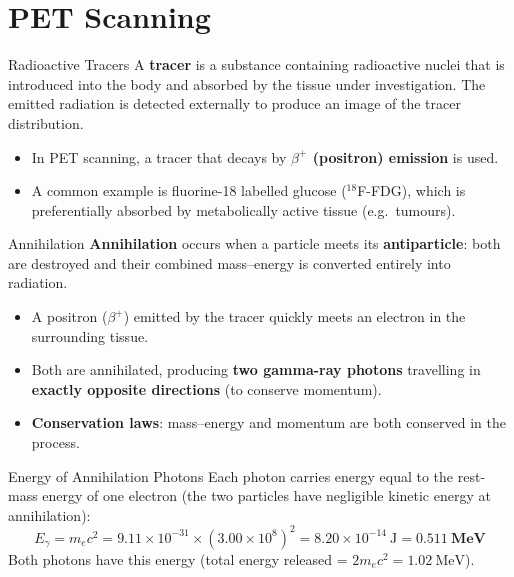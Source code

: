 \section{PET Scanning}

\begin{definitionbox}{Radioactive Tracers}
A \textbf{tracer} is a substance containing radioactive nuclei that is introduced into the body and absorbed by the tissue under investigation. The emitted radiation is detected externally to produce an image of the tracer distribution.
\begin{itemize}[itemsep=2pt]
  \item In PET scanning, a tracer that decays by \textbf{$\beta^+$ (positron) emission} is used.
  \item A common example is fluorine-18 labelled glucose ($^{18}$F-FDG), which is preferentially absorbed by metabolically active tissue (e.g.\ tumours).
\end{itemize}
\end{definitionbox}

\begin{definitionbox}{Annihilation}
\textbf{Annihilation} occurs when a particle meets its \textbf{antiparticle}: both are destroyed and their combined mass--energy is converted entirely into radiation.
\begin{itemize}[itemsep=2pt]
  \item A positron ($\beta^+$) emitted by the tracer quickly meets an electron in the surrounding tissue.
  \item Both are annihilated, producing \textbf{two gamma-ray photons} travelling in \textbf{exactly opposite directions} (to conserve momentum).
  \item \textbf{Conservation laws}: mass--energy and momentum are both conserved in the process.
\end{itemize}
\end{definitionbox}

\begin{formulabox}{Energy of Annihilation Photons}
Each photon carries energy equal to the rest-mass energy of one electron (the two particles have negligible kinetic energy at annihilation):
$$E_\gamma = m_e c^2 = 9.11\times10^{-31} \times (3.00\times10^8)^2 = 8.20\times10^{-14}\ \text{J} = \mathbf{0.511\ \text{MeV}}$$
Both photons have this energy (total energy released = $2m_e c^2 = 1.02\ \text{MeV}$).
\end{formulabox}

